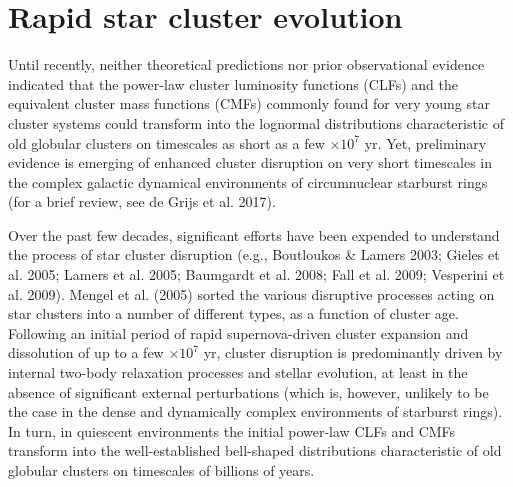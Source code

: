 \documentclass{raa}            %
\begin{document}
   \maketitle

%
%
\section{Rapid star cluster evolution}           %
\label{sect:intro}

Until recently, neither theoretical predictions nor prior
observational evidence indicated that the power-law cluster luminosity
functions (CLFs) and the equivalent cluster mass functions (CMFs)
commonly found for very young star cluster systems could transform
into the lognormal distributions characteristic of old globular
clusters on timescales as short as a few $\times 10^7$ yr. Yet,
preliminary evidence is emerging of enhanced cluster disruption on
very short timescales in the complex galactic dynamical environments
of circumnuclear starburst rings (for a brief review, see de Grijs et
al. 2017).

Over the past few decades, significant efforts have been expended to
understand the process of star cluster disruption (e.g., Boutloukos \&
Lamers 2003; Gieles et al. 2005; Lamers et al. 2005; Baumgardt et
al. 2008; Fall et al. 2009; Vesperini et al. 2009). Mengel et
al. (2005) sorted the various disruptive processes acting on star
clusters into a number of different types, as a function of cluster
age. Following an initial period of rapid supernova-driven cluster
expansion and dissolution of up to a few $\times 10^7$ yr, cluster
disruption is predominantly driven by internal two-body relaxation
processes and stellar evolution, at least in the absence of
significant external perturbations (which is, however, unlikely to be
the case in the dense and dynamically complex environments of
starburst rings). In turn, in quiescent environments the initial
power-law CLFs and CMFs transform into the well-established
bell-shaped distributions characteristic of old globular clusters on
timescales of billions of years.
\end{document}
